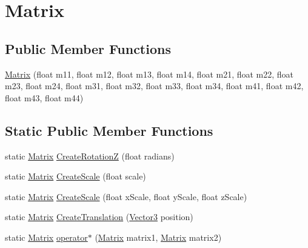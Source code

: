 \hypertarget{structMicrosoft_1_1Xna_1_1Framework_1_1Matrix}{}\section{Matrix}
\label{structMicrosoft_1_1Xna_1_1Framework_1_1Matrix}
\subsection*{Public Member Functions}
\begin{DoxyCompactItemize}
\item 
\hyperlink{structMicrosoft_1_1Xna_1_1Framework_1_1Matrix_a4f8989c50f3a730cf0780b190572c1e6}{Matrix} (float m11, float m12, float m13, float m14, float m21, float m22, float m23, float m24, float m31, float m32, float m33, float m34, float m41, float m42, float m43, float m44)
\end{DoxyCompactItemize}
\subsection*{Static Public Member Functions}
\begin{DoxyCompactItemize}
\item 
static \hyperlink{structMicrosoft_1_1Xna_1_1Framework_1_1Matrix}{Matrix} \hyperlink{structMicrosoft_1_1Xna_1_1Framework_1_1Matrix_a2242afc0fd024ae44247a109451f8117}{Create\+Rotation\+Z} (float radians)
\item 
static \hyperlink{structMicrosoft_1_1Xna_1_1Framework_1_1Matrix}{Matrix} \hyperlink{structMicrosoft_1_1Xna_1_1Framework_1_1Matrix_acce9e58a30e484e98433ef895af94a8c}{Create\+Scale} (float scale)
\item 
static \hyperlink{structMicrosoft_1_1Xna_1_1Framework_1_1Matrix}{Matrix} \hyperlink{structMicrosoft_1_1Xna_1_1Framework_1_1Matrix_a0d0d7e0756f6d83ea127fd0dff456f0d}{Create\+Scale} (float x\+Scale, float y\+Scale, float z\+Scale)
\item 
static \hyperlink{structMicrosoft_1_1Xna_1_1Framework_1_1Matrix}{Matrix} \hyperlink{structMicrosoft_1_1Xna_1_1Framework_1_1Matrix_ac0065440e4db80e7ce71f5ffbb173d75}{Create\+Translation} (\hyperlink{structMicrosoft_1_1Xna_1_1Framework_1_1Vector3}{Vector3} position)
\item 
static \hyperlink{structMicrosoft_1_1Xna_1_1Framework_1_1Matrix}{Matrix} \hyperlink{structMicrosoft_1_1Xna_1_1Framework_1_1Matrix_a955995db11ff1eb82a8bc261cf5267c7}{operator$\ast$} (\hyperlink{structMicrosoft_1_1Xna_1_1Framework_1_1Matrix}{Matrix} matrix1, \hyperlink{structMicrosoft_1_1Xna_1_1Framework_1_1Matrix}{Matrix} matrix2)
\end{DoxyCompactItemize}
